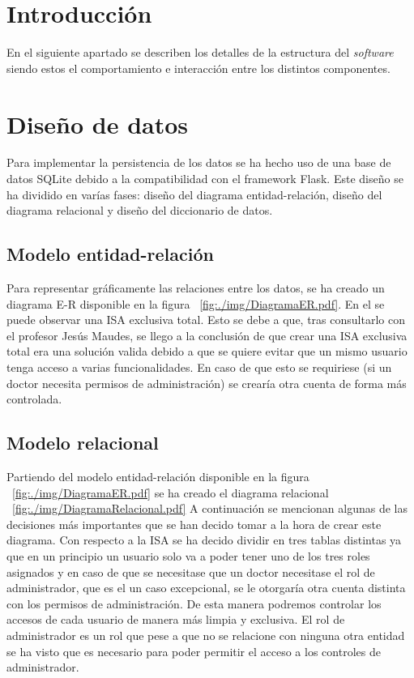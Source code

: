 
\section{Introducción}
En el siguiente apartado se describen los detalles de la estructura del \textit{software} siendo estos el comportamiento e interacción entre los distintos componentes.

\section{Diseño de datos}
Para implementar la persistencia de los datos se ha hecho uso de una base de datos SQLite debido a la compatibilidad con el framework Flask. Este diseño se ha dividido en varías fases: diseño del diagrama entidad-relación, diseño del diagrama relacional y diseño del diccionario de datos.

\subsection{Modelo entidad-relación}

Para representar gráficamente las relaciones entre los datos, se ha creado un diagrama E-R disponible en la figura ~\ref{fig:./img/DiagramaER.pdf}. En el se puede observar una ISA exclusiva total. Esto se debe a que, tras consultarlo con el profesor Jesús Maudes, se llego a la conclusión de que crear una ISA exclusiva total era una solución valida debido a que se quiere evitar que un mismo usuario tenga acceso a varias funcionalidades. En caso de que esto se requiriese (si un doctor necesita permisos de administración) se crearía otra cuenta de forma más controlada.


\subsection{Modelo relacional}

Partiendo del modelo entidad-relación disponible en la figura ~\ref{fig:./img/DiagramaER.pdf} se ha creado el diagrama relacional ~\ref{fig:./img/DiagramaRelacional.pdf}
A continuación se mencionan algunas de las decisiones más importantes que se han decido tomar a la hora de crear este diagrama.
Con respecto a la ISA se ha decido dividir en tres tablas distintas ya que en un principio un usuario solo va a poder tener uno de los tres roles asignados y en caso de que se necesitase que un doctor necesitase el rol de administrador, que es el un caso excepcional, se le otorgaría otra cuenta distinta con los permisos de administración. De esta manera podremos controlar los accesos de cada usuario de manera más limpia y exclusiva.
El rol de administrador es un rol que pese a que no se relacione con ninguna otra entidad se ha visto que es necesario para poder permitir el acceso a los controles de administrador.




